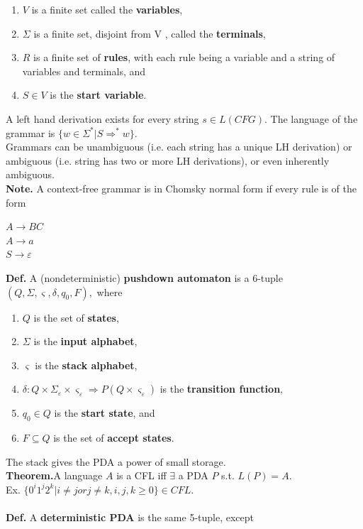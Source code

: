 \documentclass[12pt]{article}
\begin{document}
\begin{multicols}{2}
\begin{enumerate}
\itemsep-0.5em
\item $V$ is a finite set called the \textbf{variables},
\item $\Sigma$ is a finite set, disjoint from V , called the \textbf{terminals},
\item $R$ is a finite set of \textbf{rules}, with each rule being a variable and a string of variables and terminals, and
\item $S \in V$ is the \textbf{start variable}.
\end{enumerate}
A left hand derivation exists for every string $s \in L(CFG).$ The language of the grammar is $\lbrace w \in \Sigma^{*} | S \Rightarrow^{*} w \rbrace.$\\
Grammars can be unambiguous (i.e. each string has a unique LH derivation) or ambiguous (i.e. string has two or more LH derivations), or even inherently ambiguous.\\
\textbf{Note.} A context-free grammar is in Chomsky normal form if every rule is of the form
\begin{center}
$A \rightarrow BC$\\
$A \rightarrow a$\\
$S \rightarrow \varepsilon$
\end{center}
\textbf{Def.} A (nondeterministic) \textbf{pushdown automaton} is a 6-tuple $(Q, \Sigma, \varsigma, \delta, q_{0}, F),$ where
\begin{enumerate}
\item $Q$ is the set of \textbf{states},
\item $\Sigma$ is the \textbf{input alphabet},
\item $\varsigma$ is the \textbf{stack alphabet},
\item $\delta : Q \times \Sigma_{\varepsilon} \times \varsigma_{\varepsilon} \Rightarrow P(Q \times \varsigma_{\varepsilon})$ is the \textbf{transition function},
\item $q_{0} \in Q$ is the \textbf{start state}, and
\item $F \subseteq Q$ is the set of \textbf{accept states}.
\end{enumerate}
The stack gives the PDA a power of small storage.\\
\textbf{Theorem.}A language $A$ is a CFL iff $\exists$ a PDA $P$ s.t. $L(P) = A.$\\
Ex. $\lbrace 0^{i}1^{j}2^{k} | i \neq j or j \neq k, i,j,k \geq 0 \rbrace \in CFL.$\\\\
\textbf{Def.} A \textbf{deterministic PDA} is the same 5-tuple, except

\end{multicols}
\end{document}
